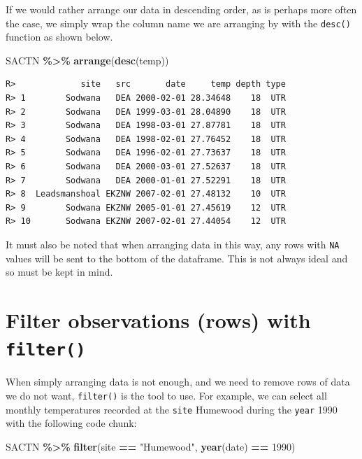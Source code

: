 \documentclass[
]{book}
\newenvironment{Shaded}{\begin{snugshade}}{\end{snugshade}}
\newcommand{\DecValTok}[1]{\textcolor[rgb]{0.00,0.00,0.81}{#1}}
\newcommand{\KeywordTok}[1]{\textcolor[rgb]{0.13,0.29,0.53}{\textbf{#1}}}
\newcommand{\NormalTok}[1]{#1}
\newcommand{\OperatorTok}[1]{\textcolor[rgb]{0.81,0.36,0.00}{\textbf{#1}}}
\newcommand{\StringTok}[1]{\textcolor[rgb]{0.31,0.60,0.02}{#1}}
\begin{document}
If we would rather arrange our data in descending order, as is perhaps more often the case, we simply wrap the column name we are arranging by with the \texttt{desc()} function as shown below.

\begin{Shaded}
\begin{Highlighting}[]
\NormalTok{SACTN }\OperatorTok{\%>\%}\StringTok{ }
\StringTok{  }\KeywordTok{arrange}\NormalTok{(}\KeywordTok{desc}\NormalTok{(temp))}
\end{Highlighting}
\end{Shaded}

\begin{verbatim}
R>             site   src       date     temp depth type
R> 1        Sodwana   DEA 2000-02-01 28.34648    18  UTR
R> 2        Sodwana   DEA 1999-03-01 28.04890    18  UTR
R> 3        Sodwana   DEA 1998-03-01 27.87781    18  UTR
R> 4        Sodwana   DEA 1998-02-01 27.76452    18  UTR
R> 5        Sodwana   DEA 1996-02-01 27.73637    18  UTR
R> 6        Sodwana   DEA 2000-03-01 27.52637    18  UTR
R> 7        Sodwana   DEA 2000-01-01 27.52291    18  UTR
R> 8  Leadsmanshoal EKZNW 2007-02-01 27.48132    10  UTR
R> 9        Sodwana EKZNW 2005-01-01 27.45619    12  UTR
R> 10       Sodwana EKZNW 2007-02-01 27.44054    12  UTR
\end{verbatim}

It must also be noted that when arranging data in this way, any rows with \texttt{NA} values will be sent to the bottom of the dataframe. This is not always ideal and so must be kept in mind.

\hypertarget{filter-observations-rows-with-filter}{%
\section{\texorpdfstring{Filter observations (rows) with \texttt{filter()}}{Filter observations (rows) with filter()}}\label{filter-observations-rows-with-filter}}

When simply arranging data is not enough, and we need to remove rows of data we do not want, \texttt{filter()} is the tool to use. For example, we can select all monthly temperatures recorded at the \texttt{site} Humewood during the \texttt{year} 1990 with the following code chunk:

\begin{Shaded}
\begin{Highlighting}[]
\NormalTok{SACTN }\OperatorTok{\%>\%}\StringTok{ }
\StringTok{  }\KeywordTok{filter}\NormalTok{(site }\OperatorTok{==}\StringTok{ "Humewood"}\NormalTok{, }\KeywordTok{year}\NormalTok{(date) }\OperatorTok{==}\StringTok{ }\DecValTok{1990}\NormalTok{)}
\end{Highlighting}
\end{Shaded}
\end{document}
